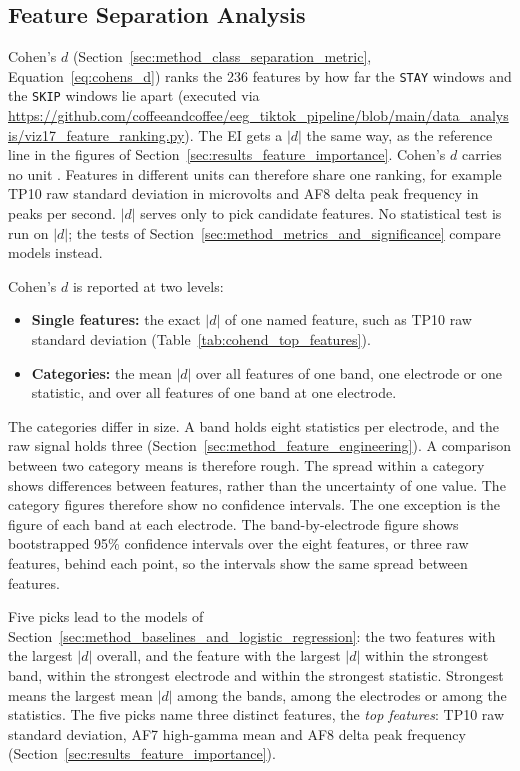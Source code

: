 \documentclass[12pt,a4paper]{report}
\begin{document}
\subsection{Feature Separation Analysis}
\label{sec:method_feature_separation_cohen_d}
Cohen's \(d\) (Section~\ref{sec:method_class_separation_metric}, Equation~\ref{eq:cohens_d}) ranks the 236 features by how far the \texttt{STAY} windows and the \texttt{SKIP} windows lie apart (executed via \url{https://github.com/coffeeandcoffee/eeg_tiktok_pipeline/blob/main/data_analysis/viz17_feature_ranking.py}). The EI gets a \(|d|\) the same way, as the reference line in the figures of Section~\ref{sec:results_feature_importance}. Cohen's \(d\) carries no unit \cite{cohen_statistical_1988}. Features in different units can therefore share one ranking, for example TP10 raw standard deviation in microvolts and AF8 delta peak frequency in peaks per second. \(|d|\) serves only to pick candidate features. No statistical test is run on \(|d|\); the tests of Section~\ref{sec:method_metrics_and_significance} compare models instead.

Cohen's \(d\) is reported at two levels:
\begin{itemize}
    \item \textbf{Single features:} the exact \(|d|\) of one named feature, such as TP10 raw standard deviation (Table~\ref{tab:cohend_top_features}).
    \item \textbf{Categories:} the mean \(|d|\) over all features of one band, one electrode or one statistic, and over all features of one band at one electrode.
\end{itemize}
The categories differ in size. A band holds eight statistics per electrode, and the raw signal holds three (Section~\ref{sec:method_feature_engineering}). A comparison between two category means is therefore rough. The spread within a category shows differences between features, rather than the uncertainty of one value. The category figures therefore show no confidence intervals. The one exception is the figure of each band at each electrode. The band-by-electrode figure shows bootstrapped 95\% confidence intervals over the eight features, or three raw features, behind each point, so the intervals show the same spread between features.

Five picks lead to the models of Section~\ref{sec:method_baselines_and_logistic_regression}: the two features with the largest \(|d|\) overall, and the feature with the largest \(|d|\) within the strongest band, within the strongest electrode and within the strongest statistic. Strongest means the largest mean \(|d|\) among the bands, among the electrodes or among the statistics. The five picks name three distinct features, the \emph{top features}: TP10 raw standard deviation, AF7 high-gamma mean and AF8 delta peak frequency (Section~\ref{sec:results_feature_importance}).
\end{document}
